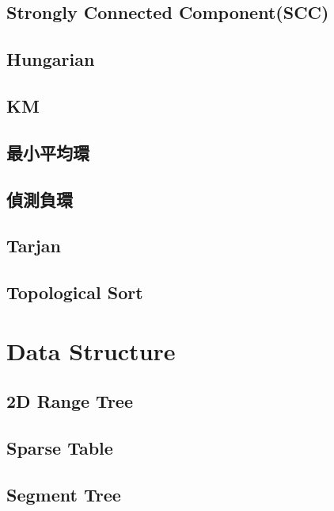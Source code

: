\subsection{Strongly Connected Component(SCC)}

\subsection{Hungarian}

\subsection{KM}

\subsection{最小平均環}

\subsection{偵測負環}

\subsection{Tarjan}

\subsection{Topological Sort}


\section{Data Structure}

\subsection{2D Range Tree}

\subsection{Sparse Table}

\subsection{Segment Tree}

